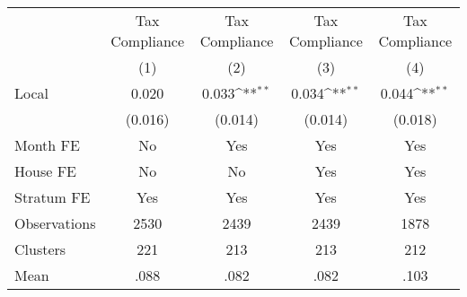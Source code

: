 {
\def\sym#1{\ifmmode^{#1}\else\(^{#1}\)\fi}
\begin{tabular}{l*{4}{c}}
\toprule
                &\multicolumn{1}{c}{Tax Compliance}&\multicolumn{1}{c}{Tax Compliance}&\multicolumn{1}{c}{Tax Compliance}&\multicolumn{1}{c}{Tax Compliance}\\
                &\multicolumn{1}{c}{(1)}         &\multicolumn{1}{c}{(2)}         &\multicolumn{1}{c}{(3)}         &\multicolumn{1}{c}{(4)}         \\
\midrule
Local           &    0.020         &    0.033\sym{**} &    0.034\sym{**} &    0.044\sym{**} \\
                &  (0.016)         &  (0.014)         &  (0.014)         &  (0.018)         \\
Month FE        &       No         &      Yes         &      Yes         &      Yes         \\
House FE        &       No         &       No         &      Yes         &      Yes         \\
Stratum FE      &      Yes         &      Yes         &      Yes         &      Yes         \\
\midrule
Observations    &     2530         &     2439         &     2439         &     1878         \\
Clusters        &      221         &      213         &      213         &      212         \\
Mean            &     .088         &     .082         &     .082         &     .103         \\
\bottomrule
\end{tabular}
}
